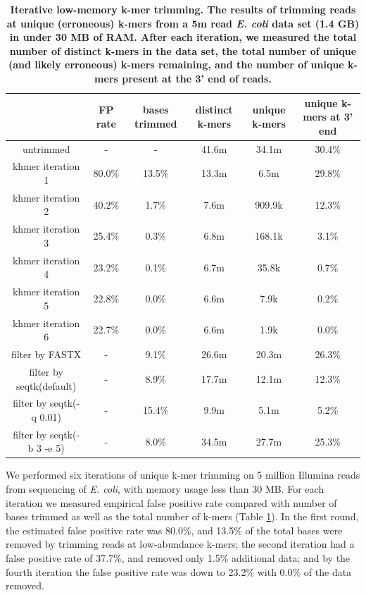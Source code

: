 \begin{table}[!ht]
\caption{
\bf{Iterative low-memory k-mer trimming.  The results of trimming
  reads at unique (erroneous) k-mers from a 5m read {\em E. coli} data set (1.4 GB)
  in under 30 MB of RAM.  After each iteration, we measured the
  total number of distinct k-mers in the data set, the total number
  of unique (and likely erroneous) k-mers remaining, and the
  number of unique k-mers present at the 3' end of reads.}}
\begin{tabular}{ | c | c | c | c | c | c |}
\hline
 & FP rate & bases trimmed & distinct k-mers & unique k-mers & 
unique k-mers at 3' end \\
\hline
untrimmed                           &      -  &      - & 41.6m & 34.1m & 30.4\%  \\
khmer iteration 1                   & 80.0\%  & 13.5\% & 13.3m &  6.5m & 29.8\% \\
khmer iteration 2                   & 40.2\%  &  1.7\% &  7.6m & 909.9k & 12.3\% \\
khmer iteration 3                   & 25.4\%  &  0.3\% &  6.8m & 168.1k & 3.1\% \\
khmer iteration 4                   & 23.2\%  &  0.1\% &  6.7m &  35.8k & 0.7\% \\
khmer iteration 5                   & 22.8\%  &  0.0\% &  6.6m &   7.9k & 0.2\% \\
khmer iteration 6                   & 22.7\%  &  0.0\% &  6.6m &   1.9k & 0.0\% \\
filter by FASTX                     &      -  &  9.1\% & 26.6m & 20.3m & 26.3\% \\
filter by seqtk(default)            &      -  &  8.9\% & 17.7m & 12.1m & 12.3\% \\
filter by seqtk(-q 0.01)            &      -  & 15.4\% &  9.9m &  5.1m &  5.2\% \\
filter by seqtk(-b 3 -e 5)          &      -  &  8.0\% & 34.5m & 27.7m & 25.3\% \\
\end{tabular}
\begin{flushleft}
\end{flushleft}
\label{table:loop_trim}
\end{table}


We performed six iterations of unique k-mer trimming on 5 million Illumina
reads from sequencing of {\em E. coli}, with memory usage less than 30 MB.  For
each iteration we measured empirical false positive rate compared with number
of bases trimmed as well as the total number of k-mers (Table
\ref{table:loop_trim}).  In the first round, the estimated false positive rate
was 80.0\%, and 13.5\% of the total bases were removed by trimming reads at
low-abundance k-mers; the second iteration had a false positive rate of 37.7\%,
and removed only 1.5\% additional data; and by the fourth iteration the false
positive rate was down to 23.2\% with 0.0\% of the data removed.

